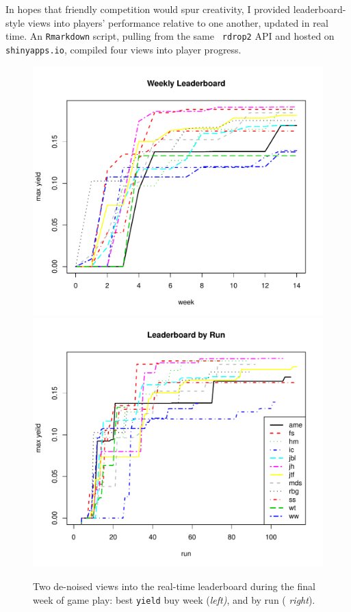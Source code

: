 \documentclass[12pt]{article}
\begin{document}
In hopes that friendly competition would spur creativity, I provided
leaderboard-style views into players' performance relative to one another,
updated in real time.  An {\tt Rmarkdown} script, pulling from the same {\tt
rdrop2} API and hosted on \verb!shinyapps.io!, compiled four views into player
progress.
\begin{figure}[ht!]
\centering
\includegraphics[scale=0.5,trim=0 0 16 0]{weekly_denoised}
\includegraphics[scale=0.5,trim=50 0 15 0,clip=TRUE]{run_denoised}
\caption{Two de-noised views into the real-time leaderboard during the final
week of game play: best {\tt yield} buy week ({\em left)}, and by run ({\em
right}).}
\label{f:leader}
\end{figure}
\end{document}

